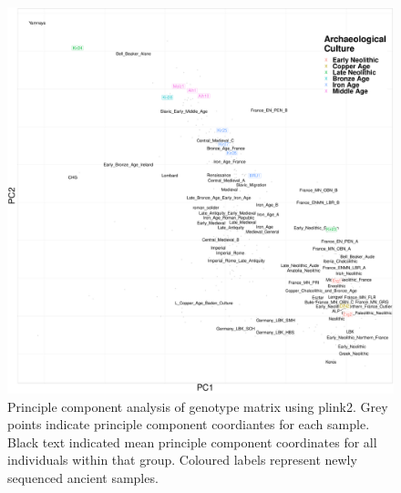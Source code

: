 \begin{figure}[htp]
    \centering
    \includegraphics[width=1.0\textwidth]{../images/appendix/plink_withHG_PCA.pdf}
    \caption{Principle component analysis of genotype matrix using plink2. Grey points indicate principle component coordiantes for each sample. Black text indicated mean principle component coordinates for all individuals within that group. Coloured labels represent newly sequenced ancient samples. }
    \label{fig:plink_PCA_HG}
\end{figure}


